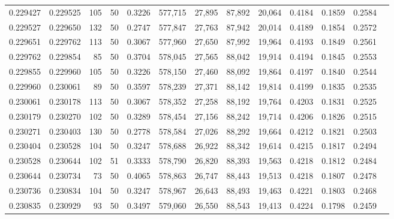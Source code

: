 \begin{tabular}{rrrrrrrrrrrrr}
0.229427 & 0.229525 &   105 &  50 &                                     0.3226 & 577,715 &  27,895 &  87,892 &  20,064 & 0.4184 & 0.1859 & 0.2584 \\
0.229527 & 0.229650 &   132 &  50 &                                     0.2747 & 577,847 &  27,763 &  87,942 &  20,014 & 0.4189 & 0.1854 & 0.2572 \\
0.229651 & 0.229762 &   113 &  50 &                                     0.3067 & 577,960 &  27,650 &  87,992 &  19,964 & 0.4193 & 0.1849 & 0.2561 \\
0.229762 & 0.229854 &    85 &  50 &                                     0.3704 & 578,045 &  27,565 &  88,042 &  19,914 & 0.4194 & 0.1845 & 0.2553 \\
0.229855 & 0.229960 &   105 &  50 &                                     0.3226 & 578,150 &  27,460 &  88,092 &  19,864 & 0.4197 & 0.1840 & 0.2544 \\
0.229960 & 0.230061 &    89 &  50 &                                     0.3597 & 578,239 &  27,371 &  88,142 &  19,814 & 0.4199 & 0.1835 & 0.2535 \\
0.230061 & 0.230178 &   113 &  50 &                                     0.3067 & 578,352 &  27,258 &  88,192 &  19,764 & 0.4203 & 0.1831 & 0.2525 \\
0.230179 & 0.230270 &   102 &  50 &                                     0.3289 & 578,454 &  27,156 &  88,242 &  19,714 & 0.4206 & 0.1826 & 0.2515 \\
0.230271 & 0.230403 &   130 &  50 &                                     0.2778 & 578,584 &  27,026 &  88,292 &  19,664 & 0.4212 & 0.1821 & 0.2503 \\
0.230404 & 0.230528 &   104 &  50 &                                     0.3247 & 578,688 &  26,922 &  88,342 &  19,614 & 0.4215 & 0.1817 & 0.2494 \\
0.230528 & 0.230644 &   102 &  51 &                                     0.3333 & 578,790 &  26,820 &  88,393 &  19,563 & 0.4218 & 0.1812 & 0.2484 \\
0.230644 & 0.230734 &    73 &  50 &                                     0.4065 & 578,863 &  26,747 &  88,443 &  19,513 & 0.4218 & 0.1807 & 0.2478 \\
0.230736 & 0.230834 &   104 &  50 &                                     0.3247 & 578,967 &  26,643 &  88,493 &  19,463 & 0.4221 & 0.1803 & 0.2468 \\
0.230835 & 0.230929 &    93 &  50 &                                     0.3497 & 579,060 &  26,550 &  88,543 &  19,413 & 0.4224 & 0.1798 & 0.2459 \\

\end{tabular}
